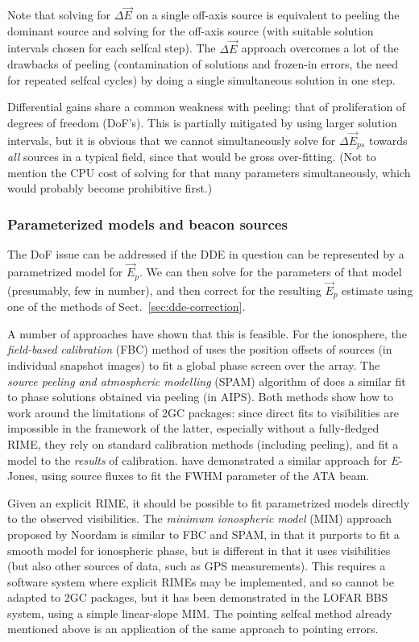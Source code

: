 \documentclass{aa}
\newcommand{\jones}[2]{\vec {#1}_{#2}}
\begin{document}
Note that solving for $\Delta\jones{E}{}$ on a single off-axis source is equivalent to peeling the dominant source and solving for the off-axis source (with suitable solution intervals chosen for each selfcal step). The $\Delta\jones{E}{}$ approach overcomes a lot of the drawbacks of peeling (contamination of solutions and frozen-in errors, the need for repeated selfcal cycles) by doing a single simultaneous solution in one step.

Differential gains share a common weakness with peeling: that of proliferation of degrees of freedom (DoF's). This is partially mitigated by using larger solution intervals, but it is obvious that we cannot simultaneously solve for $\Delta\jones{E}{ps}$ towards \emph{all} sources in a typical field, since that would be gross over-fitting. (Not to mention the CPU cost of solving for that many parameters simultaneously, which would probably become prohibitive first.) 

\subsubsection{Parameterized models and beacon sources}

The DoF issue can be addressed if the DDE in question can be represented by a parametrized model for $\jones{E}{p}$. We can then solve for the parameters of that model (presumably, few in number), and then correct for the resulting $\jones{E}{p}$ estimate using one of the methods of Sect.~\ref{sec:dde-correction}. 

A number of approaches have shown that this is feasible. For the ionosphere, the \emph{field-based calibration} (FBC) method of \citet{Cotton:FBC} uses the position offsets of sources (in individual snapshot images) to fit a global phase screen over the array. The \emph{source peeling and atmospheric modelling} (SPAM) algorithm of \citet{Intema:SPAM} does a similar fit to phase solutions obtained via peeling (in AIPS). Both methods show how to work around the limitations of 2GC packages: since direct fits to visibilities are impossible in the framework of the latter, especially without a fully-fledged RIME, they rely on standard calibration methods (including peeling), and fit a model to the \emph{results} of calibration. \citet{Hull:ata-beam-fitting} have demonstrated a similar approach for $E$-Jones, using source fluxes to fit the FWHM parameter of the ATA beam. 

Given an explicit RIME, it should be possible to fit parametrized models directly to the observed visibilities. The \emph{minimum ionospheric model} (MIM) approach proposed by Noordam is similar to FBC and SPAM, in that it purports to fit a smooth model for ionospheric phase, but is different in that it uses visibilities (but also other sources of data, such as GPS measurements). This requires a software system where explicit RIMEs may be implemented, and so cannot be adapted to 2GC packages, but it has been demonstrated in the LOFAR BBS system, using a simple linear-slope MIM. The pointing selfcal method \citep{SB:pointing} already mentioned above is an application of the same approach to pointing errors.
\end{document}
